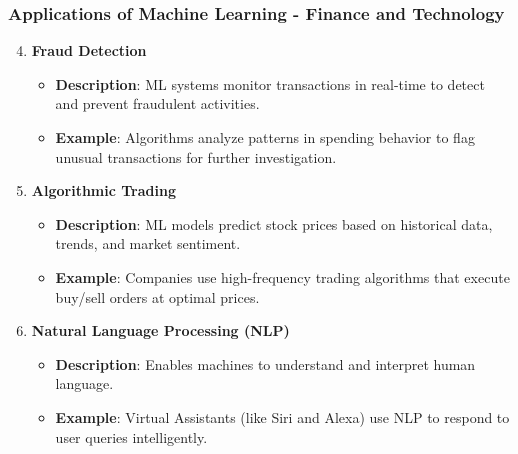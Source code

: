 \documentclass{beamer}
\begin{document}
\begin{frame}[fragile]
    \frametitle{Applications of Machine Learning - Finance and Technology}
    \begin{enumerate}
        \setcounter{enumi}{3}
        \item \textbf{Fraud Detection}
        \begin{itemize}
            \item \textbf{Description}: ML systems monitor transactions in real-time to detect and prevent fraudulent activities.
            \item \textbf{Example}: Algorithms analyze patterns in spending behavior to flag unusual transactions for further investigation.
        \end{itemize}

        \item \textbf{Algorithmic Trading}
        \begin{itemize}
            \item \textbf{Description}: ML models predict stock prices based on historical data, trends, and market sentiment.
            \item \textbf{Example}: Companies use high-frequency trading algorithms that execute buy/sell orders at optimal prices.
        \end{itemize}

        \item \textbf{Natural Language Processing (NLP)}
        \begin{itemize}
            \item \textbf{Description}: Enables machines to understand and interpret human language.
            \item \textbf{Example}: Virtual Assistants (like Siri and Alexa) use NLP to respond to user queries intelligently.
        \end{itemize}
    \end{enumerate}
\end{frame}
\end{document}

